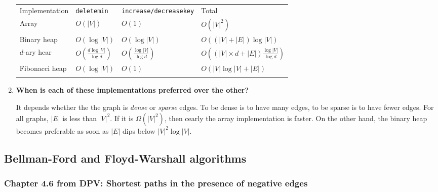 \documentclass[a4paper,11pt]{article}
\begin{document}
\begin{enumerate}
  \begin{longtable}[c]{@{}llll@{}}
  \toprule\addlinespace
  Implementation & \texttt{deletemin} & \texttt{increase/decreasekey} &
  Total
  \\\addlinespace
  \midrule\endhead
  Array & $O(|V|)$ & $O(1)$ & $O(|V|^2)$
  \\\addlinespace
  Binary heap & $O(\log|V|)$ & $O(\log|V|)$ & $O((|V| + |E|) \log|V|)$
  \\\addlinespace
  $d$-ary hear & $O(\frac{d \log |V|}{\log d})$ &
  $O(\frac{\log |V|}{\log d})$ &
  $O((|V| \times d + |E|) \frac{\log|V|}{\log d})$
  \\\addlinespace
  Fibonacci heap & $O(\log |V|)$ & $O(1)$ & $O(|V|\log |V| + |E|)$
  \\\addlinespace
  \bottomrule
  \end{longtable}
\item
  \textbf{When is each of these implementations preferred over the
  other?}

  It depends whether the the graph is \emph{dense} or \emph{sparse}
  edges. To be dense is to have many edges, to be sparse is to have
  fewer edges. For all graphs, $|E|$ is less than $|V|^2$. If it is
  $\Omega(|V|^2)$, then cearly the array implementation is faster. On
  the other hand, the binary heap becomes preferable as soon as $|E|$
  dips below \textbar{}$|V|^2 \log |V|$.
\end{enumerate}

\subsection{Bellman-Ford and Floyd-Warshall
algorithms}\label{bellman-ford-and-floyd-warshall-algorithms}

\subsubsection{Chapter 4.6 from DPV: Shortest paths in the presence of
negative
edges}\label{chapter-4.6-from-dpv-shortest-paths-in-the-presence-of-negative-edges}
\end{document}
